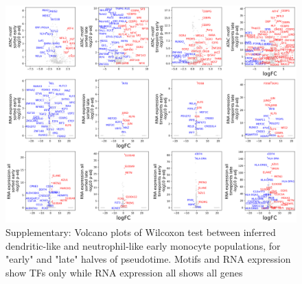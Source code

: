 \documentclass[a4paper]{article}
\begin{document}
\begin{figure}[!htb]
  \centering
  \includegraphics[width=\textwidth]{../figures/hematopoiesis/markers_early_groups_detailed_assays.png}
  \caption{Supplementary: Volcano plots of Wilcoxon test between inferred dendritic-like and neutrophil-like early monocyte populations, for "early" and "late" halves of pseudotime. Motifs and RNA expression show TFs only while RNA expression all shows all genes}
\end{figure}
\end{document}
